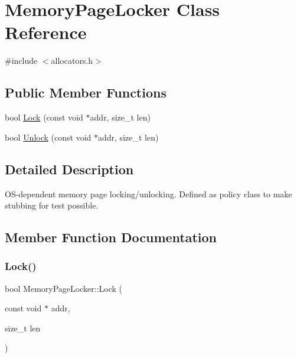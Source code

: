 \hypertarget{class_memory_page_locker}{}\section{Memory\+Page\+Locker Class Reference}
\label{class_memory_page_locker}


{\ttfamily \#include $<$allocators.\+h$>$}

\subsection*{Public Member Functions}
\begin{DoxyCompactItemize}
\item 
bool \mbox{\hyperlink{class_memory_page_locker_af411b6f6320864616cdd1b28ba9201fe}{Lock}} (const void $\ast$addr, size\+\_\+t len)
\item 
bool \mbox{\hyperlink{class_memory_page_locker_af9e9ad0edadcd8250db05f95cd6a49a7}{Unlock}} (const void $\ast$addr, size\+\_\+t len)
\end{DoxyCompactItemize}


\subsection{Detailed Description}
O\+S-\/dependent memory page locking/unlocking. Defined as policy class to make stubbing for test possible. 

\subsection{Member Function Documentation}
\mbox{\label{class_memory_page_locker_af411b6f6320864616cdd1b28ba9201fe}} 
\subsubsection{\texorpdfstring{Lock()}{Lock()}}
{\footnotesize\ttfamily bool Memory\+Page\+Locker\+::\+Lock (\begin{DoxyParamCaption}\item[{const void $\ast$}]{addr,  }\item[{size\+\_\+t}]{len }\end{DoxyParamCaption})\hspace{0.3cm}{\ttfamily [inline]}}


